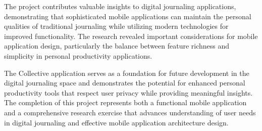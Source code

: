 The project contributes valuable insights to digital journaling applications, demonstrating that sophisticated mobile applications can maintain the personal qualities of traditional journaling while utilizing modern technologies for improved functionality. The research revealed important considerations for mobile application design, particularly the balance between feature richness and simplicity in personal productivity applications.

The Collective application serves as a foundation for future development in the digital journaling space and demonstrates the potential for enhanced personal productivity tools that respect user privacy while providing meaningful insights. The completion of this project represents both a functional mobile application and a comprehensive research exercise that advances understanding of user needs in digital journaling and effective mobile application architecture design.